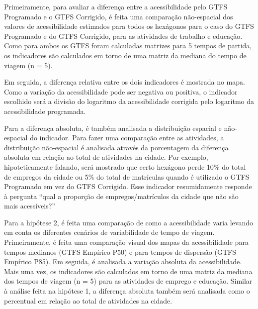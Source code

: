 \documentclass[        
    a4paper,          %
    12pt,             %
    chapter=TITLE,    %
    section=Title,    %
    subsection=Title, %
    oneside,          %
    english,          %
    spanish,          %
    brazil,           %
    fleqn             %
]{abntex2}
\begin{document}
  \begin{figure}[!h]
  \captionsetup{width=16cm}
  \centering
  \end{figure}
  
  Primeiramente, para avaliar a diferença entre a acessibilidade pelo GTFS Programado e o GTFS Corrigido, é feita uma comparação não-espacial dos valores de acessibilidade estimados para todos os hexágonos para o caso do GTFS Programado e do GTFS Corrigido, para as atividades de trabalho e educação. Como para ambos os GTFS foram calculadas matrizes para 5 tempos de partida, os indicadores são calculados em torno de uma matriz da mediana do tempo de viagem (n = 5).
  
  Em seguida, a diferença relativa entre os dois indicadores é mostrada no mapa. Como a variação da acessibilidade pode ser negativa ou positiva, o indicador escolhido será a divisão do logaritmo da acessibilidade corrigida pelo logaritmo da acessibilidade programada.
  
  Para a diferença absoluta, é também analisada a distribuição espacial e não-espacial do indicador. Para fazer uma comparação entre as atividades, a distribuição não-espacial é analisada através da porcentagem da diferença absoluta em relação ao total de atividades na cidade. Por exemplo, hipoteticamente falando, será mostrado que certo hexágono perde 10\% do total de empregos da cidade ou 5\% do total de matrículas quando é utilizado o GTFS Programado em vez do GTFS Corrigido. Esse indicador resumidamente responde à pergunta ``qual a proporção de empregos/matrículos da cidade que não são mais acessíveis?''
  
  Para a hipótese 2, é feita uma comparação de como a acessibilidade varia levando em conta os diferentes cenários de variabilidade de tempo de viagem. Primeiramente, é feita uma comparação visual dos mapas da acessibilidade para tempos medianos (GTFS Empírico P50) e para tempos de dispersão (GTFS Empírico P85). Em seguida, é analisada a variação absoluta da acessibilidade. Mais uma vez, os indicadores são calculados em torno de uma matriz da mediana dos tempos de viagem (n = 5) para as atividades de emprego e educação. Similar à análise feita na hipótese 1, a diferença absoluta também será analisada como o percentual em relação ao total de atividades na cidade.
  
\end{document}
